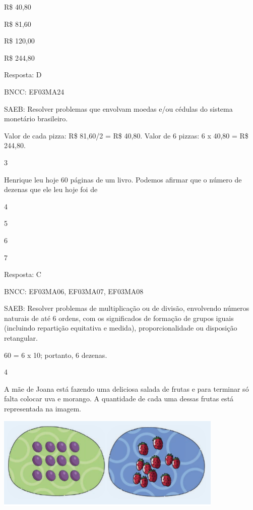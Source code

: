 \begin{escolha}
{\begin{escolha}
{\begin{escolha}

\item
  R\$ 40,80
\item
  R\$ 81,60
\item
  R\$ 120,00
\item
  R\$ 244,80
\end{escolha}

Resposta: D

BNCC: EF03MA24

SAEB: Resolver problemas que envolvam moedas e/ou cédulas do
sistema monetário brasileiro.

Valor de cada pizza: R\$ 81,60/2 = R\$ 40,80. Valor de 6 pizzas: 6 x 40,80 = R\$ 244,80.

\num{3}

Henrique leu hoje 60 páginas de um livro. Podemos afirmar que o número
de dezenas que ele leu hoje foi de

\begin{escolha}

\item
  4
\item
  5
\item
  6
\item
  7
\end{escolha}

Resposta: C

BNCC: EF03MA06, EF03MA07, EF03MA08

SAEB: Resolver problemas de multiplicação ou de divisão,
envolvendo números naturais de até 6 ordens, com os significados de
formação de grupos iguais (incluindo repartição equitativa e medida),
proporcionalidade ou disposição retangular.

60 = 6 x 10; portanto, 6 dezenas.

\num{4}

A mãe de Joana está fazendo uma deliciosa salada de frutas e para
terminar só falta colocar uva e morango. A quantidade de cada uma dessas
frutas está representada na imagem.


\includegraphics[width=4.26704in,height=1.75849in]{media/image132.png}

}
\end{escolha}}
\end{escolha}
